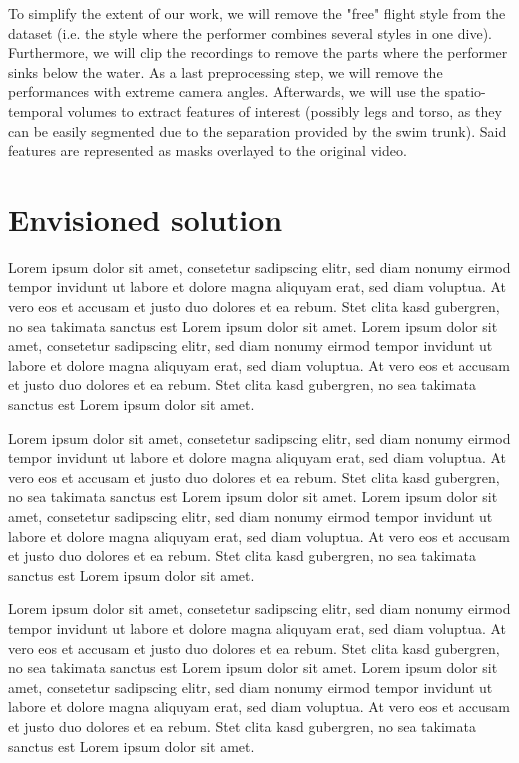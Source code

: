 \documentclass[10pt]{article}
\begin{document}
To simplify the extent of our work, we will remove the "free" flight style  from the dataset (i.e. the style where the performer combines several styles in one dive). Furthermore, we will clip the recordings to remove the parts where the performer sinks below the water. As a last preprocessing step, we will remove the performances with extreme camera angles. Afterwards, we will use the spatio-temporal volumes to extract features of interest (possibly legs and torso, as they can be easily segmented due to the separation provided by the swim trunk). Said features are represented as masks overlayed to the original video.

\section{Envisioned solution}

Lorem ipsum dolor sit amet, consetetur sadipscing elitr, sed diam nonumy eirmod tempor invidunt ut labore et dolore magna aliquyam erat, sed diam voluptua. At vero eos et accusam et justo duo dolores et ea rebum. Stet clita kasd gubergren, no sea takimata sanctus est Lorem ipsum dolor sit amet. Lorem ipsum dolor sit amet, consetetur sadipscing elitr, sed diam nonumy eirmod tempor invidunt ut labore et dolore magna aliquyam erat, sed diam voluptua. At vero eos et accusam et justo duo dolores et ea rebum. Stet clita kasd gubergren, no sea takimata sanctus est Lorem ipsum dolor sit amet.

Lorem ipsum dolor sit amet, consetetur sadipscing elitr, sed diam nonumy eirmod tempor invidunt ut labore et dolore magna aliquyam erat, sed diam voluptua. At vero eos et accusam et justo duo dolores et ea rebum. Stet clita kasd gubergren, no sea takimata sanctus est Lorem ipsum dolor sit amet. Lorem ipsum dolor sit amet, consetetur sadipscing elitr, sed diam nonumy eirmod tempor invidunt ut labore et dolore magna aliquyam erat, sed diam voluptua. At vero eos et accusam et justo duo dolores et ea rebum. Stet clita kasd gubergren, no sea takimata sanctus est Lorem ipsum dolor sit amet.

Lorem ipsum dolor sit amet, consetetur sadipscing elitr, sed diam nonumy eirmod tempor invidunt ut labore et dolore magna aliquyam erat, sed diam voluptua. At vero eos et accusam et justo duo dolores et ea rebum. Stet clita kasd gubergren, no sea takimata sanctus est Lorem ipsum dolor sit amet. Lorem ipsum dolor sit amet, consetetur sadipscing elitr, sed diam nonumy eirmod tempor invidunt ut labore et dolore magna aliquyam erat, sed diam voluptua. At vero eos et accusam et justo duo dolores et ea rebum. Stet clita kasd gubergren, no sea takimata sanctus est Lorem ipsum dolor sit amet.
\end{document}
